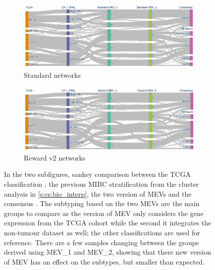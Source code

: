 \begin{figure}[!b]
    \centering
    \begin{subfigure}{1.0\linewidth}
        \includegraphics[width=1.0\textwidth,keepaspectratio]{Sections/Network_II/validation/mevs_comp_std.png}
        \caption{Standard networks}
    \end{subfigure} %
    \centering
    \begin{subfigure}{1.0\linewidth}
        \includegraphics[width=1.0\textwidth,keepaspectratio]{Sections/Network_II/validation/mevs_comp_rwd.png}
        \caption{Reward v2 networks}
    \end{subfigure}
    \centering
    \caption[Subtypes derived from MEV vs iMEV]{In the two subfigures, sankey comparison between the TCGA classification \citep{Robertson2017-mg}, the previous MIBC stratification from the cluster analysis in \cref{s:cs:bio_interp}, the two version of MEVs and the consensus \citep{Kamoun2020-tj}. The subtyping based on the two MEVs are the main groups to compare as the version of MEV only considers the gene expression from the TCGA cohort while the second it integrates the non-tumour dataset as well; the other classifications are used for reference. There are a few samples changing between the groups derived using MEV\_1 and MEV\_2, showing that there new version of MEV has an effect on the subtypes, but smaller than expected. }
    \label{fig:N_II:mevs_comp}
\end{figure}




